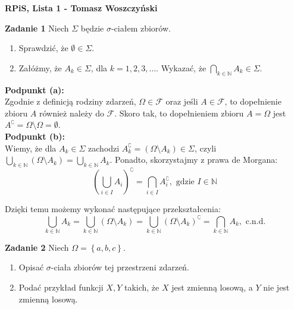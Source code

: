 \documentclass[a4paper,12pt]{article}
\newcommand{\set}[1]{\left \{ #1 \right \}}				%
\begin{document}
\noindent \textbf{RPiS, Lista 1 - Tomasz Woszczyński}\newline

\noindent \newline \textbf{Zadanie 1} \newline
Niech $\Sigma$ będzie $\sigma$-ciałem zbiorów.
\begin{enumerate}[label=(\alph*)]
    \item Sprawdzić, że $\emptyset \in \Sigma$.
    \item Załóżmy, że $A_k \in \Sigma$, dla $k = 1, 2, 3, \ldots$. Wykazać, że
            $\bigcap\limits_{k \in \mathbb{N}} A_k \in \Sigma$.
\end{enumerate}

\noindent \textbf{Podpunkt (a):} \\
Zgodnie z definicją rodziny zdarzeń, $\Omega \in \mathcal{F}$ oraz jeśli
$A \in \mathcal{F}$, to dopełnienie zbioru $A$ również należy do $\mathcal{F}$.
Skoro tak, to dopełnieniem zbioru $A = \Omega$ jest $A^\complement = 
\Omega \setminus \Omega = \emptyset$.\\

\noindent \textbf{Podpunkt (b):} \\
Wiemy, że dla $A_k \in \Sigma$ zachodzi $A_k^\complement = (\Omega \setminus A_k)
\in \Sigma$, czyli $\bigcup\limits_{k \in \mathbb{N}} (\Omega \setminus A_k) =
\bigcup\limits_{k \in \mathbb{N}} A_k$. Ponadto, skorzystajmy z prawa de Morgana:
\[
    \left(
        \bigcup\limits_{i \in I} A_i
    \right)^\complement 
    = \bigcap\limits_{i \in I} A_i^\complement, 
    \text{ gdzie } I \in \mathbb{N}
\]

\noindent Dzięki temu możemy wykonać następujące przekształcenia:
\[
    \bigcup\limits_{k \in \mathbb{N}} A_k =
        \bigcup\limits_{k \in \mathbb{N}} (\Omega \setminus A_k) =
        \bigcup\limits_{k \in \mathbb{N}} (\Omega \setminus A_k)^\complement =
        \bigcap\limits_{k \in \mathbb{N}} A_k, \text{ c.n.d.}
\]

\noindent \newline \textbf{Zadanie 2} \newline
Niech $\Omega = \set{a, b, c}$.
\begin{enumerate}[label=(\alph*)]
    \item Opisać $\sigma$-ciała zbiorów tej przestrzeni zdarzeń.
    \item Podać przykład funkcji $X, Y$ takich, że $X$ jest zmienną losową,
            a $Y$ nie jest zmienną losową.
\end{enumerate}
\end{document}
